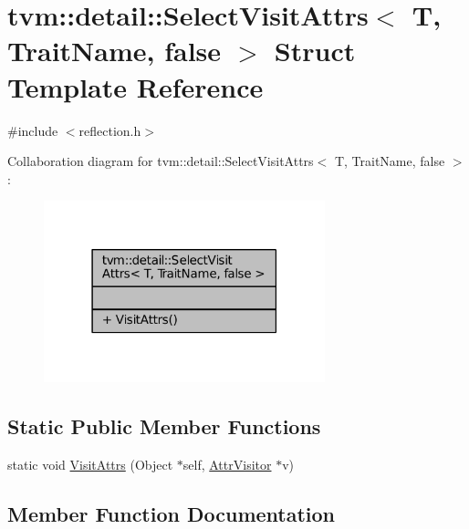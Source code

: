 \hypertarget{structtvm_1_1detail_1_1SelectVisitAttrs_3_01T_00_01TraitName_00_01false_01_4}{}\section{tvm\+:\+:detail\+:\+:Select\+Visit\+Attrs$<$ T, Trait\+Name, false $>$ Struct Template Reference}
\label{structtvm_1_1detail_1_1SelectVisitAttrs_3_01T_00_01TraitName_00_01false_01_4}


{\ttfamily \#include $<$reflection.\+h$>$}



Collaboration diagram for tvm\+:\+:detail\+:\+:Select\+Visit\+Attrs$<$ T, Trait\+Name, false $>$\+:
\nopagebreak
\begin{figure}[H]
\begin{center}
\leavevmode
\includegraphics[width=231pt]{structtvm_1_1detail_1_1SelectVisitAttrs_3_01T_00_01TraitName_00_01false_01_4__coll__graph}
\end{center}
\end{figure}
\subsection*{Static Public Member Functions}
\begin{DoxyCompactItemize}
\item 
static void \hyperlink{structtvm_1_1detail_1_1SelectVisitAttrs_3_01T_00_01TraitName_00_01false_01_4_ab93aee2a6da2e4a15afd66f9beef8374}{Visit\+Attrs} (Object $\ast$self, \hyperlink{classtvm_1_1AttrVisitor}{Attr\+Visitor} $\ast$v)
\end{DoxyCompactItemize}


\subsection{Member Function Documentation}
